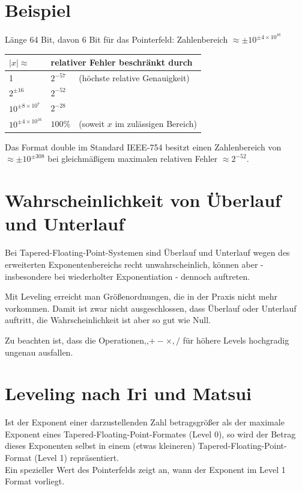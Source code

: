 \documentclass[10pt]{article}
\begin{document}
\section*{Beispiel}
Länge 64 Bit, davon 6 Bit für das Pointerfeld: Zahlenbereich $\approx \pm 10^{ \pm 4 \times 10^{16}}$

\begin{center}
\begin{tabular}{lll}
$|x| \approx$ & \multicolumn{2}{l}{relativer Fehler beschränkt durch} \\
\hline
1 & $2^{-57}$ & (höchste relative Genauigkeit) \\
$2^{ \pm 16}$ & $2^{-52}$ &  \\
$10^{ \pm 8 \times 10^{7}}$ & $2^{-28}$ &  \\
$10^{ \pm 4 \times 10^{16}}$ & $100 \%$ & (soweit $x$ im zulässigen Bereich) \\
\end{tabular}
\end{center}

Das Format double im Standard IEEE-754 besitzt einen Zahlenbereich von $\approx \pm 10^{ \pm 308}$ bei gleichmäßigem maximalen relativen Fehler $\approx 2^{-52}$.

\section*{Wahrscheinlichkeit von Überlauf und Unterlauf}
Bei Tapered-Floating-Point-Systemen sind Überlauf und Unterlauf wegen des erweiterten Exponentenbereichs recht unwahrscheinlich, können aber - insbesondere bei wiederholter Exponentiation - dennoch auftreten.

Mit Leveling erreicht man Größenordnungen, die in der Praxis nicht mehr vorkommen. Damit ist zwar nicht ausgeschlossen, dass Überlauf oder Unterlauf auftritt, die Wahrscheinlichkeit ist aber so gut wie Null.

Zu beachten ist, dass die Operationen,,$+- \times, /$ für höhere Levels hochgradig ungenau ausfallen.

\section*{Leveling nach Iri und Matsui}
Ist der Exponent einer darzustellenden Zahl betragsgrößer als der maximale Exponent eines Tapered-Floating-Point-Formates (Level 0), so wird der Betrag dieses Exponenten selbst in einem (etwas kleineren) Tapered-Floating-Point-Format (Level 1) repräsentiert.\\
Ein spezieller Wert des Pointerfelds zeigt an, wann der Exponent im Level 1 Format vorliegt.
\end{document}
